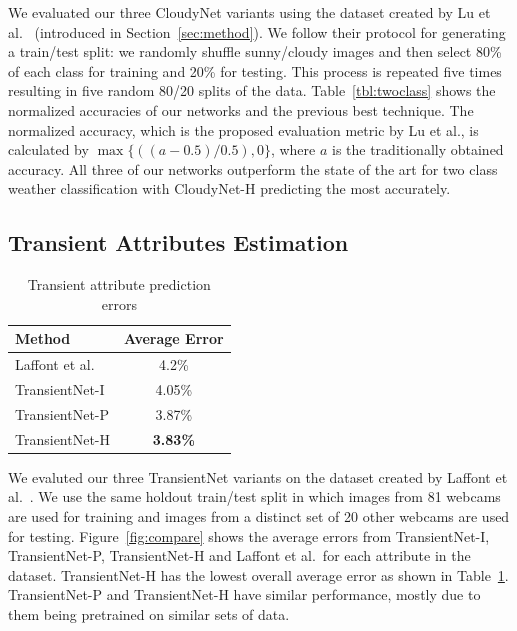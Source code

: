 \documentclass[10pt,twocolumn,letterpaper]{article}
\newcommand{\figref}[1]{Figure~\ref{fig:#1}}
\newcommand{\tblref}[1]{Table~\ref{tbl:#1}}
\begin{document}
We evaluated our three CloudyNet variants using the dataset created by Lu et
al.~\cite{lutwoclass} (introduced in Section~\ref{sec:method}). 
We follow their protocol for
generating a train/test split: we randomly shuffle sunny/cloudy images
and then select 80\% of each class for training and 20\% for testing.
This process is repeated five times resulting in five random 80/20
splits of the data. 
\tblref{twoclass} shows the normalized accuracies of our networks and
the previous best technique.  The normalized
accuracy, which is the proposed evaluation metric by Lu et al., is calculated by $ \max\{((a - 0.5) / 0.5), 0\} $, where $a$ is the
traditionally obtained accuracy. All three of our networks outperform the state
of the art for two class weather classification with CloudyNet-H predicting the
most accurately.


\subsection{Transient Attributes Estimation}

\begin{table}[t]
	\centering
	\caption{Transient attribute prediction errors}
	\begin{tabular}{ | l | c | }
		\hline
			Method & Average Error \\ \hline \hline
			Laffont et al.~\cite{Laffont14}& 4.2\% \\ \hline
			TransientNet-I & 4.05\% \\ \hline
			TransientNet-P & 3.87\% \\ \hline
			TransientNet-H & \textbf{3.83\%} \\ 
		\hline
	\end{tabular}
	\label{tbl:transient}
\end{table}

We evaluted our three TransientNet variants on the dataset created by
Laffont et al.~\cite{Laffont14}.
We use the same holdout
train/test split in which images from 81 webcams are
used for training and images from a distinct set of 20 other webcams are
used for testing. \figref{compare} shows the average
errors from TransientNet-I, TransientNet-P,
TransientNet-H and Laffont et al.\ for each attribute in the dataset.
TransientNet-H has the lowest overall
average error as shown in \tblref{transient}.  TransientNet-P and
TransientNet-H have similar performance, mostly due to them being pretrained on
similar sets of data.
\end{document}
